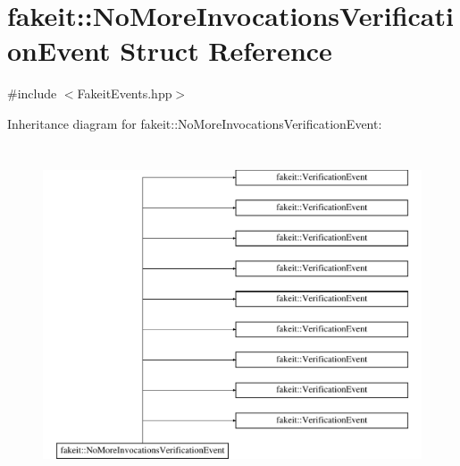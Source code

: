 \hypertarget{structfakeit_1_1NoMoreInvocationsVerificationEvent}{}\section{fakeit\+::No\+More\+Invocations\+Verification\+Event Struct Reference}
\label{structfakeit_1_1NoMoreInvocationsVerificationEvent}


{\ttfamily \#include $<$Fakeit\+Events.\+hpp$>$}

Inheritance diagram for fakeit\+::No\+More\+Invocations\+Verification\+Event\+:\begin{figure}[H]
\begin{center}
\leavevmode
\includegraphics[height=10.000000cm]{structfakeit_1_1NoMoreInvocationsVerificationEvent}
\end{center}
\end{figure}
